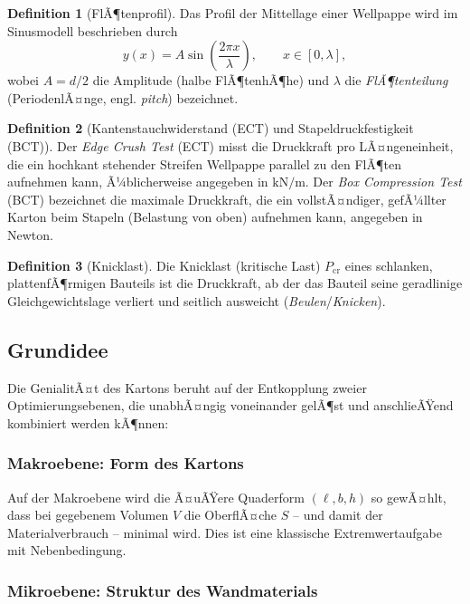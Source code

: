 ﻿\documentclass[a4paper,12pt]{article}
\theoremstyle{definition}
\newtheorem{definition}{Definition}
\begin{document}
\begin{definition}[FlÃ¶tenprofil]
	\label{def:flute}
	Das Profil der Mittellage einer Wellpappe wird im Sinusmodell beschrieben
	durch
	\[
		y(x) = A \sin\!\left(\frac{2\pi x}{\lambda}\right), \qquad x \in [0,\lambda],
	\]
	wobei $A = d/2$ die Amplitude (halbe FlÃ¶tenhÃ¶he) und $\lambda$ die
	\emph{FlÃ¶tenteilung} (PeriodenlÃ¤nge, engl. \emph{pitch}) bezeichnet.
\end{definition}

\begin{definition}[Kantenstauchwiderstand (ECT) und Stapeldruckfestigkeit (BCT)]
	Der \emph{Edge Crush Test} (ECT) misst die Druckkraft pro LÃ¤ngeneinheit, die
	ein hochkant stehender Streifen Wellpappe parallel zu den FlÃ¶ten aufnehmen
	kann, Ã¼blicherweise angegeben in $\mathrm{kN/m}$. Der \emph{Box Compression
	Test} (BCT) bezeichnet die maximale Druckkraft, die ein vollstÃ¤ndiger,
	gefÃ¼llter Karton beim Stapeln (Belastung von oben) aufnehmen kann, angegeben
	in Newton.
\end{definition}

\begin{definition}[Knicklast]
	Die Knicklast (kritische Last) $P_{\mathrm{cr}}$ eines schlanken,
	plattenfÃ¶rmigen Bauteils ist die Druckkraft, ab der das Bauteil seine
	geradlinige Gleichgewichtslage verliert und seitlich ausweicht
	(\emph{Beulen}/\emph{Knicken}).
\end{definition}

\subsection{Grundidee}

Die GenialitÃ¤t des Kartons beruht auf der Entkopplung zweier Optimierungsebenen, die
unabhÃ¤ngig voneinander gelÃ¶st und anschlieÃŸend kombiniert werden kÃ¶nnen:

\subsubsection{Makroebene: Form des Kartons}

Auf der Makroebene wird die Ã¤uÃŸere Quaderform $(\ell, b, h)$ so gewÃ¤hlt, dass bei
gegebenem Volumen $V$ die OberflÃ¤che $S$ -- und damit der Materialverbrauch -- minimal
wird. Dies ist eine klassische Extremwertaufgabe mit Nebenbedingung.

\subsubsection{Mikroebene: Struktur des Wandmaterials}
\end{document}
